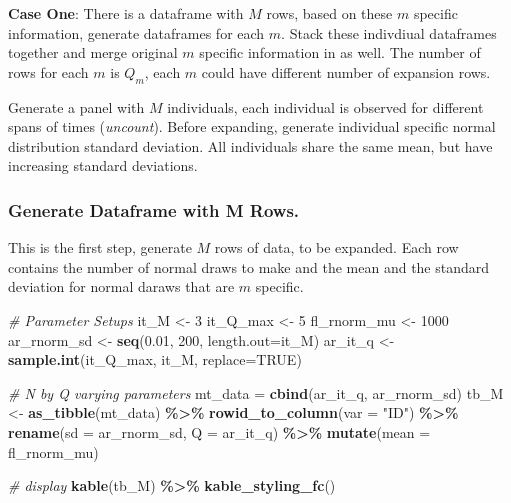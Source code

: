 \documentclass[
]{book}
\newenvironment{Shaded}{\begin{snugshade}}{\end{snugshade}}
\newcommand{\CommentTok}[1]{\textcolor[rgb]{0.56,0.35,0.01}{\textit{#1}}}
\newcommand{\DataTypeTok}[1]{\textcolor[rgb]{0.13,0.29,0.53}{#1}}
\newcommand{\DecValTok}[1]{\textcolor[rgb]{0.00,0.00,0.81}{#1}}
\newcommand{\FloatTok}[1]{\textcolor[rgb]{0.00,0.00,0.81}{#1}}
\newcommand{\KeywordTok}[1]{\textcolor[rgb]{0.13,0.29,0.53}{\textbf{#1}}}
\newcommand{\NormalTok}[1]{#1}
\newcommand{\OperatorTok}[1]{\textcolor[rgb]{0.81,0.36,0.00}{\textbf{#1}}}
\newcommand{\OtherTok}[1]{\textcolor[rgb]{0.56,0.35,0.01}{#1}}
\newcommand{\StringTok}[1]{\textcolor[rgb]{0.31,0.60,0.02}{#1}}
\begin{document}
\textbf{Case One}: There is a dataframe with \(M\) rows, based on these \(m\) specific information, generate dataframes for each \(m\). Stack these indivdiual dataframes together and merge original \(m\) specific information in as well. The number of rows for each \(m\) is \(Q_m\), each \(m\) could have different number of expansion rows.

Generate a panel with \(M\) individuals, each individual is observed for different spans of times (\emph{uncount}). Before expanding, generate individual specific normal distribution standard deviation. All individuals share the same mean, but have increasing standard deviations.

\hypertarget{generate-dataframe-with-m-rows.}{%
\subsubsection{Generate Dataframe with M Rows.}\label{generate-dataframe-with-m-rows.}}

This is the first step, generate \(M\) rows of data, to be expanded. Each row contains the number of normal draws to make and the mean and the standard deviation for normal daraws that are \(m\) specific.

\begin{Shaded}
\begin{Highlighting}[]
\CommentTok{\# Parameter Setups}
\NormalTok{it\_M \textless{}{-}}\StringTok{ }\DecValTok{3}
\NormalTok{it\_Q\_max \textless{}{-}}\StringTok{ }\DecValTok{5}
\NormalTok{fl\_rnorm\_mu \textless{}{-}}\StringTok{ }\DecValTok{1000}
\NormalTok{ar\_rnorm\_sd \textless{}{-}}\StringTok{ }\KeywordTok{seq}\NormalTok{(}\FloatTok{0.01}\NormalTok{, }\DecValTok{200}\NormalTok{, }\DataTypeTok{length.out=}\NormalTok{it\_M)}
\NormalTok{ar\_it\_q \textless{}{-}}\StringTok{ }\KeywordTok{sample.int}\NormalTok{(it\_Q\_max, it\_M, }\DataTypeTok{replace=}\OtherTok{TRUE}\NormalTok{)}

\CommentTok{\# N by Q varying parameters}
\NormalTok{mt\_data =}\StringTok{ }\KeywordTok{cbind}\NormalTok{(ar\_it\_q, ar\_rnorm\_sd)}
\NormalTok{tb\_M \textless{}{-}}\StringTok{ }\KeywordTok{as\_tibble}\NormalTok{(mt\_data) }\OperatorTok{\%\textgreater{}\%}\StringTok{ }\KeywordTok{rowid\_to\_column}\NormalTok{(}\DataTypeTok{var =} \StringTok{"ID"}\NormalTok{) }\OperatorTok{\%\textgreater{}\%}
\StringTok{                }\KeywordTok{rename}\NormalTok{(}\DataTypeTok{sd =}\NormalTok{ ar\_rnorm\_sd, }\DataTypeTok{Q =}\NormalTok{ ar\_it\_q) }\OperatorTok{\%\textgreater{}\%}
\StringTok{                }\KeywordTok{mutate}\NormalTok{(}\DataTypeTok{mean =}\NormalTok{ fl\_rnorm\_mu)}

\CommentTok{\# display}
\KeywordTok{kable}\NormalTok{(tb\_M) }\OperatorTok{\%\textgreater{}\%}
\StringTok{  }\KeywordTok{kable\_styling\_fc}\NormalTok{()}
\end{Highlighting}
\end{Shaded}
\end{document}
